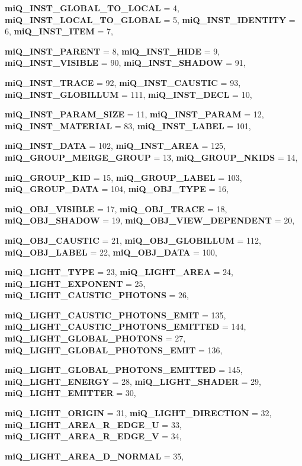 \begin{CompactItemize}
{\bf mi\-Q\_\-INST\_\-GLOBAL\_\-TO\_\-LOCAL} =  4, 
{\bf mi\-Q\_\-INST\_\-LOCAL\_\-TO\_\-GLOBAL} =  5, 
{\bf mi\-Q\_\-INST\_\-IDENTITY} =  6, 
{\bf mi\-Q\_\-INST\_\-ITEM} =  7, 
\par
{\bf mi\-Q\_\-INST\_\-PARENT} =  8, 
{\bf mi\-Q\_\-INST\_\-HIDE} =  9, 
{\bf mi\-Q\_\-INST\_\-VISIBLE} =  90, 
{\bf mi\-Q\_\-INST\_\-SHADOW} =  91, 
\par
{\bf mi\-Q\_\-INST\_\-TRACE} =  92, 
{\bf mi\-Q\_\-INST\_\-CAUSTIC} =  93, 
{\bf mi\-Q\_\-INST\_\-GLOBILLUM} =  111, 
{\bf mi\-Q\_\-INST\_\-DECL} =  10, 
\par
{\bf mi\-Q\_\-INST\_\-PARAM\_\-SIZE} =  11, 
{\bf mi\-Q\_\-INST\_\-PARAM} =  12, 
{\bf mi\-Q\_\-INST\_\-MATERIAL} =  83, 
{\bf mi\-Q\_\-INST\_\-LABEL} =  101, 
\par
{\bf mi\-Q\_\-INST\_\-DATA} =  102, 
{\bf mi\-Q\_\-INST\_\-AREA} =  125, 
{\bf mi\-Q\_\-GROUP\_\-MERGE\_\-GROUP} =  13, 
{\bf mi\-Q\_\-GROUP\_\-NKIDS} =  14, 
\par
{\bf mi\-Q\_\-GROUP\_\-KID} =  15, 
{\bf mi\-Q\_\-GROUP\_\-LABEL} =  103, 
{\bf mi\-Q\_\-GROUP\_\-DATA} =  104, 
{\bf mi\-Q\_\-OBJ\_\-TYPE} =  16, 
\par
{\bf mi\-Q\_\-OBJ\_\-VISIBLE} =  17, 
{\bf mi\-Q\_\-OBJ\_\-TRACE} =  18, 
{\bf mi\-Q\_\-OBJ\_\-SHADOW} =  19, 
{\bf mi\-Q\_\-OBJ\_\-VIEW\_\-DEPENDENT} =  20, 
\par
{\bf mi\-Q\_\-OBJ\_\-CAUSTIC} =  21, 
{\bf mi\-Q\_\-OBJ\_\-GLOBILLUM} =  112, 
{\bf mi\-Q\_\-OBJ\_\-LABEL} =  22, 
{\bf mi\-Q\_\-OBJ\_\-DATA} =  100, 
\par
{\bf mi\-Q\_\-LIGHT\_\-TYPE} =  23, 
{\bf mi\-Q\_\-LIGHT\_\-AREA} =  24, 
{\bf mi\-Q\_\-LIGHT\_\-EXPONENT} =  25, 
{\bf mi\-Q\_\-LIGHT\_\-CAUSTIC\_\-PHOTONS} =  26, 
\par
{\bf mi\-Q\_\-LIGHT\_\-CAUSTIC\_\-PHOTONS\_\-EMIT} =  135, 
{\bf mi\-Q\_\-LIGHT\_\-CAUSTIC\_\-PHOTONS\_\-EMITTED} =  144, 
{\bf mi\-Q\_\-LIGHT\_\-GLOBAL\_\-PHOTONS} =  27, 
{\bf mi\-Q\_\-LIGHT\_\-GLOBAL\_\-PHOTONS\_\-EMIT} =  136, 
\par
{\bf mi\-Q\_\-LIGHT\_\-GLOBAL\_\-PHOTONS\_\-EMITTED} =  145, 
{\bf mi\-Q\_\-LIGHT\_\-ENERGY} =  28, 
{\bf mi\-Q\_\-LIGHT\_\-SHADER} =  29, 
{\bf mi\-Q\_\-LIGHT\_\-EMITTER} =  30, 
\par
{\bf mi\-Q\_\-LIGHT\_\-ORIGIN} =  31, 
{\bf mi\-Q\_\-LIGHT\_\-DIRECTION} =  32, 
{\bf mi\-Q\_\-LIGHT\_\-AREA\_\-R\_\-EDGE\_\-U} =  33, 
{\bf mi\-Q\_\-LIGHT\_\-AREA\_\-R\_\-EDGE\_\-V} =  34, 
\par
{\bf mi\-Q\_\-LIGHT\_\-AREA\_\-D\_\-NORMAL} =  35, 

\end{CompactItemize}
